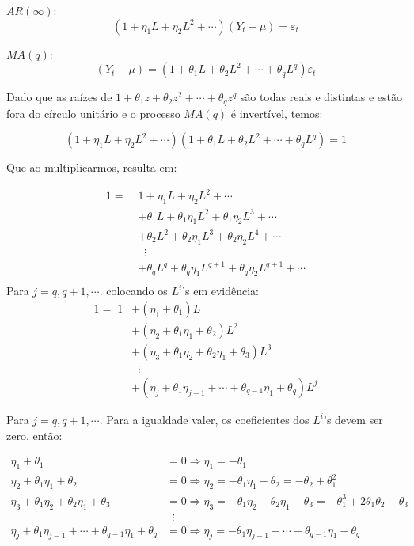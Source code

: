 \begin{enumerate}
		$AR(\infty)$: $$(1+\eta_1L+\eta_2L^2+\cdots)(Y_t-\mu)=\varepsilon_t$$
		
		$MA(q)$: $$(Y_t-\mu)=(1+\theta_1L+\theta_2L^2+\cdots+\theta_qL^q)\varepsilon_t$$
		
		Dado que as raízes de $1+\theta_1z+\theta_2z^2+\cdots+\theta_qz^q$ são todas reais e distintas e estão fora do círculo unitário e o processo $MA(q)$ é invertível, temos:
		
		$$(1+\eta_1L+\eta_2L^2+\cdots)(1+\theta_1L+\theta_2L^2+\cdots+\theta_qL^q)=1$$
		
		Que ao multiplicarmos, resulta em:
		
		\begin{align*}
			1=\;&1+\eta_1L+\eta_2L^2+\cdots	\\
			&+\theta_1L+\theta_1\eta_1L^2+\theta_1\eta_2L^3+\cdots\\
			&+\theta_2L^2+\theta_2\eta_1L^3+\theta_2\eta_2L^4+\cdots\\	
			&\;\; \vdots\\
			&+\theta_qL^q+\theta_q\eta_1L^{q+1}+\theta_q\eta_2L^{q+1}+\cdots\\	
		\end{align*}
	Para $j=q, q+1,\cdots$. colocando os $L^i$'s em evidência:
	\begin{align*}
		1=\;1&+(\eta_1+\theta_1)L\\
		&+(\eta_2+\theta_1\eta_1+\theta_2)L^2\\
		&+(\eta_3+\theta_1\eta_2+\theta_2\eta_1+\theta_3)L^3\\
		&\;\;\vdots\\
		&+(\eta_j+\theta_1\eta_{j-1}+\cdots+\theta_{q-1}\eta_1+\theta_q)L^j
	\end{align*}
	
Para $j=q,q+1,\cdots$. Para a igualdade valer, os coeficientes dos $L^i$'s devem ser zero, então:

	\begin{align*}
	\eta_1+\theta_1&=0 \Rightarrow \eta_1=-\theta_1\\
	\eta_2+\theta_1\eta_1+\theta_2&=0 \Rightarrow \eta_2=-\theta_1\eta_1-\theta_2	=-\theta_2+\theta_1^2\\
		\eta_3+\theta_1\eta_2+\theta_2\eta_1+\theta_3&=0 \Rightarrow \eta_3=-\theta_1\eta_2-\theta_2\eta_1-\theta_3=-\theta_1^3+2\theta_1\theta_2-\theta_3\\
		&\;\; \vdots\\
		\eta_j+\theta_1\eta_{j-1}+\cdots+\theta_{q-1}\eta_1+\theta_q&=0 \Rightarrow \eta_j=-\theta_1\eta_{j-1}-\cdots-\theta_{q-1}\eta_1-\theta_q
	\end{align*}
	

\end{enumerate}
